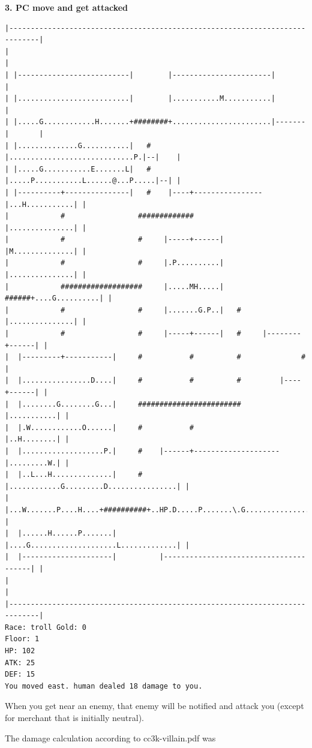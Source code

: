 \documentclass[11pt]{article}
\theoremstyle{plain}
\begin{document}
\newpage
\textbf{3. PC move and get attacked}
\begin{Verbatim}[fontsize=\scriptsize]
|-----------------------------------------------------------------------------|
|                                                                             |
| |--------------------------|        |-----------------------|               |
| |..........................|        |...........M...........|               |
| |.....G............H.......+########+.......................|-------|       |
| |..............G...........|   #    |.............................P.|--|    |
| |.....G...........E.......L|   #    |.....P...........L......@...P.....|--| |
| |----------+---------------|   #    |----+----------------|...H...........| |
|            #                 #############                |...............| |
|            #                 #     |-----+------|         |M..............| |
|            #                 #     |.P..........|         |...............| |
|            ###################     |.....MH.....|   ######+....G..........| |
|            #                 #     |.......G.P..|   #     |...............| |
|            #                 #     |-----+------|   #     |--------+------| |
|  |---------+-----------|     #           #          #              #        |
|  |................D....|     #           #          #         |----+------| |
|  |........G........G...|     ########################         |...........| |
|  |.W............O......|     #           #                    |..H........| |
|  |...................P.|     #    |------+--------------------|.........W.| |
|  |..L...H..............|     #    |............G.........D................| |
|  |...W.......P....H....+##########+..HP.D.....P.......\.G.................| |
|  |......H......P.......|          |....G....................L.............| |
|  |---------------------|          |---------------------------------------| |
|                                                                             |
|-----------------------------------------------------------------------------|
Race: troll Gold: 0                                                    Floor: 1
HP: 102
ATK: 25
DEF: 15
You moved east. human dealed 18 damage to you. 
\end{Verbatim}

When you get near an enemy, that enemy will be notified and attack you 
(except for merchant that is initially neutral).

The damage calculation according to
cc3k-villain.pdf was
\end{document}
